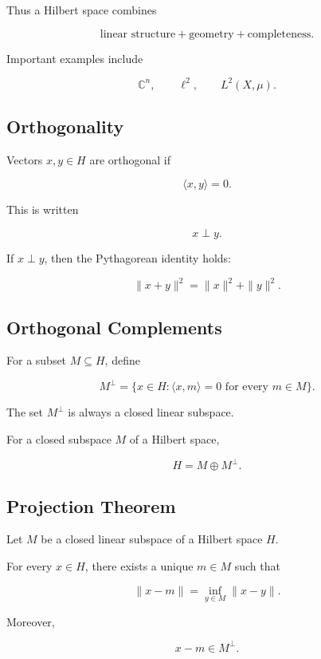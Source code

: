 Thus a Hilbert space combines

\[
\boxed{
\text{linear structure}
+
\text{geometry}
+
\text{completeness}.
}
\]

Important examples include

\[
\boxed{
\mathbb{C}^n,
\qquad
\ell^2,
\qquad
L^2(X,\mu).
}
\]

\subsection{Orthogonality}
\label{subsec:orthogonality-hilbert}

Vectors \(x,y\in H\) are orthogonal if

\[
\boxed{
\langle x,y\rangle=0.
}
\]

This is written

\[
\boxed{
x\perp y.
}
\]

If \(x\perp y\), then the Pythagorean identity holds:

\[
\boxed{
\|x+y\|^2
=
\|x\|^2+\|y\|^2.
}
\]

\subsection{Orthogonal Complements}
\label{subsec:orthogonal-complements}

For a subset \(M\subseteq H\), define

\[
\boxed{
M^\perp
=
\{
x\in H:
\langle x,m\rangle=0
\text{ for every }m\in M
\}.
}
\]

The set \(M^\perp\) is always a closed linear subspace.

For a closed subspace \(M\) of a Hilbert space,

\[
\boxed{
H=M\oplus M^\perp.
}
\]

\subsection{Projection Theorem}
\label{subsec:projection-theorem}

\begin{theorem}
Let \(M\) be a closed linear subspace of a Hilbert space \(H\).

For every \(x\in H\), there exists a unique \(m\in M\) such that

\[
\boxed{
\|x-m\|
=
\inf_{y\in M}\|x-y\|.
}
\]

Moreover,

\[
\boxed{
x-m\in M^\perp.
}
\]
\end{theorem}

